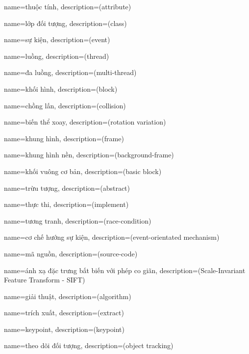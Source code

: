 {
    name={thuộc tính},
    description={(attribute)}
}

{
    name={lớp đối tượng},
    description={(class)}
}

{
    name={sự kiện},
    description={(event)}
}

{
    name={luồng},
    description={(thread)}
}

{
    name={đa luồng},
    description={(multi-thread)}
}

{
    name={khối hình},
    description={(block)}
}

{
    name={chồng lấn},
    description={(collision)}
}

{
    name={biến thể xoay},
    description={(rotation variation)}
}

{
    name={khung hình},
    description={(frame)}
}

{
    name={khung hình nền},
    description={(background-frame)}
}

{
    name={khối vuông cơ bản},
    description={(basic block)}
}

{
    name={trừu tượng},
    description={(abstract)}
}

{
    name={thực thi},
    description={(implement)}
}

{
    name={tương tranh},
    description={(race-condition)}
}

{
    name={cơ chế hướng sự kiện},
    description={(event-orientated mechanism)}
}

{
    name={mã nguồn},
    description={(source-code)}
}

{
    name={ánh xạ đặc trưng bất biến với phép co giãn},
    description={(Scale-Invariant Feature Transform - SIFT)}
}

{
    name={giải thuật},
    description={(algorithm)}
}

{
    name={trích xuất},
    description={(extract)}
}

{
    name={keypoint},
    description={(keypoint)}
}

{
    name={theo dõi đối tượng},
    description={(object tracking)}
}


